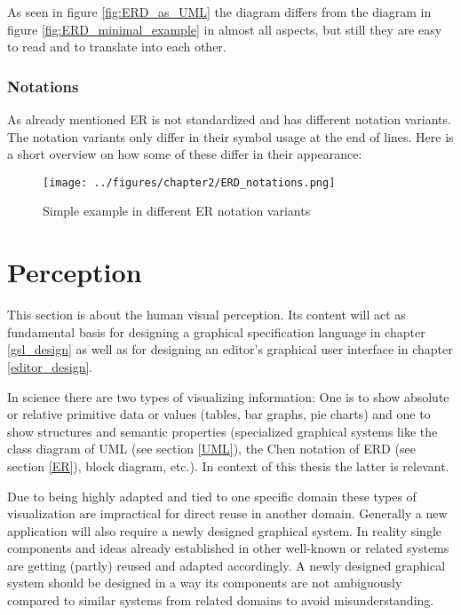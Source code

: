 \documentclass[twoside, openright, 12pt]{book}
\begin{document}
As seen in figure \ref{fig:ERD_as_UML} the diagram differs from the diagram in figure \ref{fig:ERD_minimal_example} in almost all aspects, but still they are easy to read and to translate into each other.



\subsubsection{Notations}
\label{ERD_notations}
As already mentioned ER is not standardized and has different notation variants.
The notation variants only differ in their symbol usage at the end of lines.
Here is a short overview on how some of these differ in their appearance:

\begin{figure}[htb]
	\centering
	\texttt{[image: ../figures/chapter2/ERD\_notations.png]}
	\caption{Simple example in different ER notation variants}
	\label{fig:ERD_notations}
\end{figure}




\section{Perception}
\label{gestalt_laws_and_human_optical_perception}
This section is about the human visual perception.
Its content will act as fundamental basis for designing a graphical specification language in chapter \ref{gsl_design} as well as for designing an editor's graphical user interface in chapter \ref{editor_design}.

In science there are two types of visualizing information:
One is to show absolute or relative primitive data or values (tables, bar graphs, pie charts) and one to show structures and semantic properties (specialized graphical systems like the class diagram of UML (see section \ref{UML}), the Chen notation of ERD (see section \ref{ER}), block diagram, etc.).
In context of this thesis the latter is relevant.

Due to being highly adapted and tied to one specific domain these types of visualization are impractical for direct reuse in another domain.
Generally a new application will also require a newly designed graphical system.
In reality single components and ideas already established in other well-known or related systems are getting (partly) reused and adapted accordingly.
A newly designed graphical system should be designed in a way its components are not ambiguously compared to similar systems from related domains to avoid misunderstanding.
\end{document}
